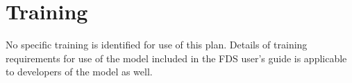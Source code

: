 \documentclass[11pt]{book}
\begin{document}
\section{Training}

No specific training is identified for use of this plan.  Details of training requirements for use of the model included in the FDS user's guide is applicable to developers of the model as well.









\backmatter
\nopart



\printindex
\end{document}

